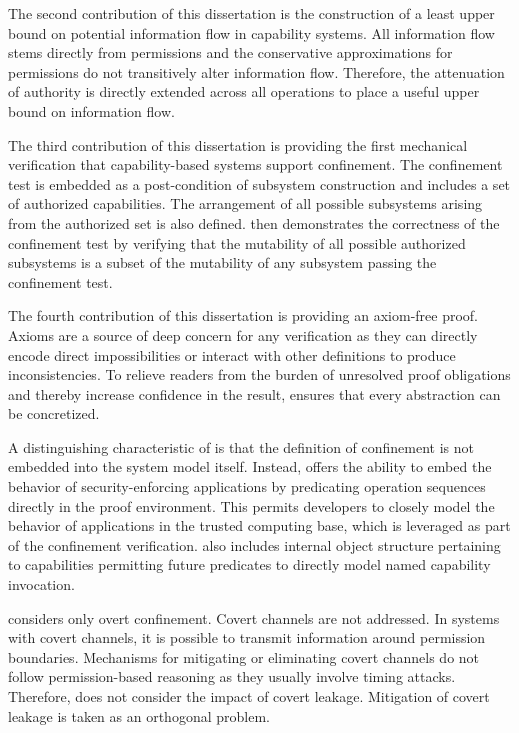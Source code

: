 The second contribution of this dissertation is the construction of a least upper bound on potential information flow in capability systems.
All information flow stems directly from permissions and the conservative approximations for permissions do not transitively alter information flow.
Therefore, the attenuation of authority is directly extended across all operations to place a useful upper bound on information flow.

The third contribution of this dissertation is providing the first mechanical verification that capability-based systems support confinement.
The confinement test is embedded as a post-condition of subsystem construction and includes a set of authorized capabilities.
The arrangement of all possible subsystems arising from the authorized set is also defined.
\TMmodelName{} then demonstrates the correctness of the confinement test by verifying that the mutability of all possible authorized subsystems is a subset of the mutability of any subsystem passing the confinement test.

The fourth contribution of this dissertation is providing an axiom-free proof.
Axioms are a source of deep concern for any verification as they can directly encode direct impossibilities or interact with other definitions to produce inconsistencies.
To relieve readers from the burden of unresolved proof obligations and thereby increase confidence in the result, \TMmodelName{} ensures that every abstraction can be concretized.

A distinguishing characteristic of \TMmodelName{} is that the definition of confinement is not embedded into the system model itself.
Instead, \TMmodelName{} offers the ability to embed the behavior of security-enforcing applications by predicating operation sequences directly in the proof environment.
This permits developers to closely model the behavior of applications in the trusted computing base, which is leveraged as part of the confinement verification.
\TMmodelName{} also includes internal object structure pertaining to capabilities permitting future predicates to directly model named capability invocation.

\TMmodelName{} considers only overt confinement. Covert channels are not addressed.
In systems with covert channels, it is possible to transmit information around permission boundaries.
Mechanisms for mitigating or eliminating covert channels do not follow permission-based reasoning as they usually involve timing attacks.
Therefore, \TMmodelName{} does not consider the impact of covert leakage.
Mitigation of covert leakage is taken as an orthogonal problem.

